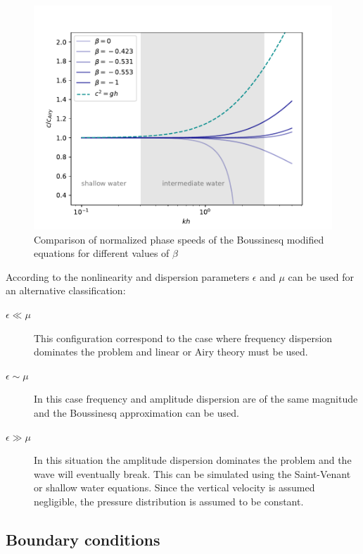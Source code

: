 \begin{figure}
    \centering
    \includegraphics[width=.8\textwidth]{img/eq/dispersion_beta.pdf}
    \caption{Comparison of normalized phase speeds of the Boussinesq modified equations for different values of $\beta$}
    \label{phase_speed_beta}
\end{figure}

According to \cite{ursell1953} the nonlinearity and dispersion parameters $\epsilon$ and $\mu$ can be used for an alternative classification:

\begin{description}
    \item[$\epsilon \ll \mu$]  This configuration correspond to the case where frequency dispersion dominates the problem and linear or Airy theory must be used.
    \item[$\epsilon \sim \mu$] In this case frequency and amplitude dispersion are of the same magnitude and the Boussinesq approximation can be used.
    \item[$\epsilon \gg \mu$] In this situation the amplitude dispersion dominates the problem and the wave will eventually break. This can be simulated using the Saint-Venant or shallow water equations. Since the vertical velocity is assumed negligible, the pressure distribution is assumed to be constant.
\end{description}






\subsection{Boundary conditions}
\label{equations_bsq_bc}


